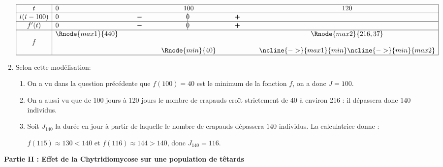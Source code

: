 \begin{enumerate}
\begin{center}
{\renewcommand{\arraystretch}{1.3}
\def\esp{\hspace*{1.5cm}}%
\def\hauteur{0pt}%
$\begin{array}{|c|l *3{c} c|}
\hline
 t & 0 & \esp & 100 & \esp & 120 \\
 \hline
t(t-100) & 0 &  \pmb{-} & \vline\hspace{-2.7pt}0 & \pmb{+} & \\  
 \hline
f'(t) &  0 &  \pmb{-} & \vline\hspace{-2.7pt}0 & \pmb{+} & \\  
\hline
  & \Rnode{max1}{440}  &  &  &  & \Rnode{max2}{216,37}   \\
f & &  & & &  \rule{0pt}{\hauteur} \\
 &  & &   \Rnode{min}{40} & & \rule{0pt}{\hauteur}
\ncline{->}{max1}{min} \ncline{->}{min}{max2}\\
\hline
\end{array}$
}
\end{center}


 \item Selon cette modélisation:
	\begin{enumerate}
		\item %
On a vu dans la question précédente que $f(100) = 40$ est le minimum de la fonction $f$, on a donc $J = 100$.
		\item %
		On a aussi vu que de 100 jours à 120 jours le nombre de crapauds croît strictement de 40 à environ 216 : il dépassera donc 140 individus.
		\item %
		
Soit $J_{140}$ la durée en jour à partir de laquelle le nombre de crapauds dépassera $140$ individus. La calculatrice donne :
		
		$f(115) \approx 130<140$ et $f(116) \approx 144>140$, donc $J_{140} = 116$.
	\end{enumerate}
\end{enumerate}


\begin{center}\textbf{Partie II : Effet de la Chytridiomycose sur une population de têtards}\end{center}

